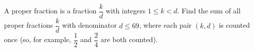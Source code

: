 A proper fraction is a fraction $\dfrac kd$ with integers $1\le k<d$. Find the sum of all proper fractions $\dfrac kd$ with denominator $d\le69$, where each pair $(k,d)$ is counted once (so, for example, $\dfrac12$ and $\dfrac24$ are both counted).
